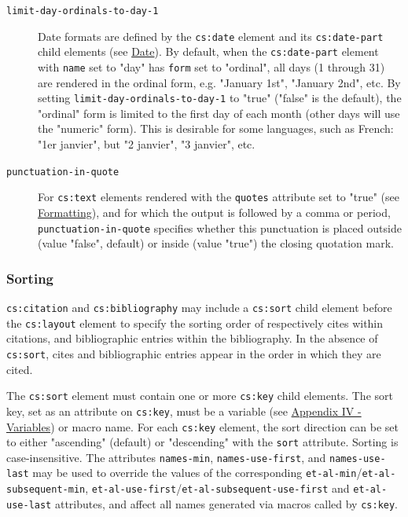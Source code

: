 \begin{description}
\item[\texttt{limit-day-ordinals-to-day-1}]
Date formats are defined by the \texttt{cs:date} element and its
\texttt{cs:date-part} child elements (see
\protect\hyperlink{date}{Date}). By default, when the
\texttt{cs:date-part} element with \texttt{name} set to "day" has
\texttt{form} set to "ordinal", all days (1 through 31) are rendered in
the ordinal form, e.g. "January 1st", "January 2nd", etc. By setting
\texttt{limit-day-ordinals-to-day-1} to "true" ("false" is the default),
the "ordinal" form is limited to the first day of each month (other days
will use the "numeric" form). This is desirable for some languages, such
as French: "1er janvier", but "2 janvier", "3 janvier", etc.
\item[\texttt{punctuation-in-quote}]
For \texttt{cs:text} elements rendered with the \texttt{quotes}
attribute set to "true" (see
\protect\hyperlink{formatting}{Formatting}), and for which the output is
followed by a comma or period, \texttt{punctuation-in-quote} specifies
whether this punctuation is placed outside (value "false", default) or
inside (value "true") the closing quotation mark.
\end{description}

\hypertarget{sorting}{%
\subsubsection{Sorting}\label{sorting}}

\texttt{cs:citation} and \texttt{cs:bibliography} may include a
\texttt{cs:sort} child element before the \texttt{cs:layout} element to
specify the sorting order of respectively cites within citations, and
bibliographic entries within the bibliography. In the absence of
\texttt{cs:sort}, cites and bibliographic entries appear in the order in
which they are cited.

The \texttt{cs:sort} element must contain one or more \texttt{cs:key}
child elements. The sort key, set as an attribute on \texttt{cs:key},
must be a variable (see
\protect\hyperlink{appendix-iv---variables}{Appendix IV - Variables}) or
macro name. For each \texttt{cs:key} element, the sort direction can be
set to either "ascending" (default) or "descending" with the
\texttt{sort} attribute. Sorting is case-insensitive. The attributes
\texttt{names-min}, \texttt{names-use-first}, and
\texttt{names-use-last} may be used to override the values of the
corresponding \texttt{et-al-min}/\texttt{et-al-subsequent-min},
\texttt{et-al-use-first}/\texttt{et-al-subsequent-use-first} and
\texttt{et-al-use-last} attributes, and affect all names generated via
macros called by \texttt{cs:key}.

